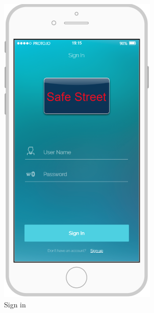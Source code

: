 \documentclass{article}
\begin{document}
\begin{figure}[h]
\begin{subfigure}[h]{0.49\linewidth}
				\includegraphics[width=\linewidth]{images/Sign_In.png}
				\caption{Sign in}
			\end{subfigure}	
			\begin{subfigure}[h]{0.49\linewidth}

\end{subfigure}
\end{figure}
\end{document}
